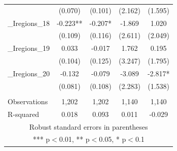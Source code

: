 \documentclass[]{article}
\begin{document}
\begin{tabular}{lcccc}
 & (0.070) & (0.101) & (2.162) & (1.595) \\
\_Iregions\_18 & -0.223** & -0.207* & -1.869 & 1.020 \\
 & (0.109) & (0.116) & (2.611) & (2.049) \\
\_Iregions\_19 & 0.033 & -0.017 & 1.762 & 0.195 \\
 & (0.104) & (0.125) & (3.247) & (1.795) \\
\_Iregions\_20 & -0.132 & -0.079 & -3.089 & -2.817* \\
 & (0.081) & (0.108) & (2.283) & (1.538) \\
 &  &  &  &  \\
Observations & 1,202 & 1,202 & 1,140 & 1,140 \\
 R-squared & 0.018 & 0.093 & 0.011 & -0.029 \\ \hline
\multicolumn{5}{c}{ Robust standard errors in parentheses} \\
\multicolumn{5}{c}{ *** p$<$0.01, ** p$<$0.05, * p$<$0.1} \\
\end{tabular}
\end{document}
